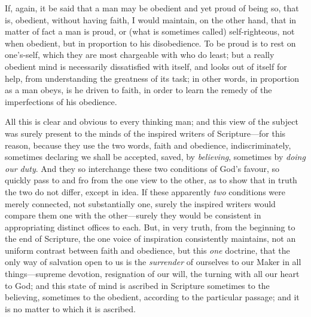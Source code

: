 If, again, it be said that a man may be obedient and yet proud of
being so, that is, obedient, without having faith, I would maintain,
on the other hand, that in matter of fact a man is proud, or (what is
sometimes called) self-righteous, not when obedient, but in proportion
to his disobedience. To be proud is to rest on one's-self, which they
are most chargeable with who do least; but a really obedient mind is
necessarily dissatisfied with itself, and looks out of itself for
help, from understanding the greatness of its task; in other words, in
proportion as a man obeys, is he driven to faith, in order to learn
the remedy of the imperfections of his obedience.

All this is clear and obvious to every thinking man; and this view
of the subject was surely present to the minds of the inspired writers
of Scripture—for this reason, because they use the two words, faith
and obedience, indiscriminately, sometimes declaring we shall be
accepted, saved, by \emph{believing}, sometimes by \emph{doing our duty}.
And they so interchange these two conditions of God's favour, so
quickly pass to and fro from the one view to the other, as to show
that in truth the two do not differ, except in idea. If these
apparently \emph{two} conditions were merely connected, not
substantially one, surely the inspired writers would compare them one
with the other—surely they would be consistent in appropriating
distinct offices to each. But, in very truth, from the beginning to
the end of Scripture, the one voice of inspiration consistently
maintains, not an uniform contrast between faith and obedience, but
this \emph{one} doctrine, that the only way of salvation open to us is
the \emph{surrender} of ourselves to our Maker in all things—supreme
devotion, resignation of our will, the turning with all our heart to
God; and this state of mind is ascribed in Scripture sometimes to the
believing, sometimes to the obedient, according to the particular
passage; and it is no matter to which it is ascribed.

